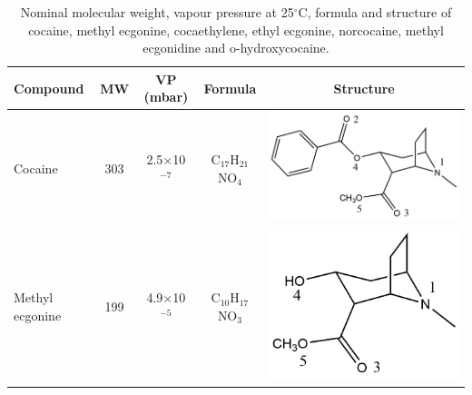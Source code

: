 \begin{table}
\centering
\caption{Nominal molecular weight, vapour pressure at 25$^\circ$C, formula and structure of cocaine, methyl ecgonine, cocaethylene, ethyl ecgonine, norcocaine, methyl ecgonidine and o-hydroxycocaine.}
\begin{tabular}{lcccc}
\textbf{Compound} &  \textbf{MW} & \textbf{VP (mbar)} & \textbf{Formula} & \textbf{Structure} \\ 
\toprule
Cocaine &   303 &2.5$\times$10$^{-7}$ &  C$_{17}$H$_{21}$NO$_4$ & \begin{minipage}[c]{0.26\linewidth}\centering \includegraphics[width=\linewidth]{pics/cocaine-chapter/COC_struct.png}\end{minipage}\\ \midrule
Methyl ecgonine & 199 & 4.9$\times$10$^{-5}$& C$_{10}$H$_{17}$NO$_3$ & \begin{minipage}[c]{0.26\linewidth}\centering \includegraphics[width=.8\linewidth]{pics/cocaine-chapter/MeEcg_struct.png} \end{minipage} \\ \midrule

\end{tabular}
\end{table}
